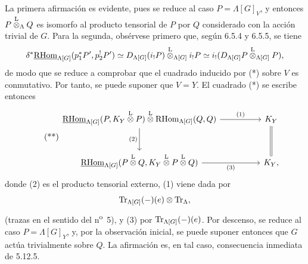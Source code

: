 La primera afirmación es evidente, pues se reduce al caso $P=\Lambda[G]_V$, y entonces $P\overset{\mathrm L}{\otimes}_{\Lambda}Q$ es isomorfo al producto tensorial de $P$ por $Q$ considerado con la acción trivial de $G$. Para la segunda, obsérvese primero que, según 6.5.4 y 6.5.5, se tiene
\[
\delta^*\underline{\mathrm{RHom}}_{\Lambda[G]}(p_1^*P',p_2^!P')
\simeq
D_{\Lambda[G]}(i_!P)\overset{\mathrm L}{\otimes}_{\Lambda[G]} i_!P
\simeq
i_!(D_{\Lambda[G]}P\overset{\mathrm L}{\otimes}_{\Lambda[G]}P),
\]
de modo que se reduce a comprobar que el cuadrado inducido por (*) sobre $V$ es conmutativo. Por tanto, se puede suponer que $V=Y$. El cuadrado (*) se escribe entonces
\begin{equation}
\tag{**}
\begin{tikzcd}[column sep=huge,row sep=large]
\uRHom_{\Lambda[G]}(P,K_Y\lten P)\lten\RHom_{\Lambda[G]}(Q,Q)
  \arrow[r,"(1)"] \arrow[d,"(2)"']
& K_Y \arrow[d,equal]\\
\uRHom_{\Lambda[G]}(P\lten Q,K_Y\lten P\lten Q) \arrow[r,"(3)"']
& K_Y ,
\end{tikzcd}
\end{equation}
donde (2) es el producto tensorial externo, (1) viene dada por
\[
\operatorname{Tr}_{\Lambda[G]}(-)(e)\otimes\operatorname{Tr}_{\Lambda},
\]
(trazas en el sentido del n\textsuperscript{o}~5), y (3) por $\operatorname{Tr}_{\Lambda[G]}(-)(e)$. Por descenso, se reduce al caso $P=\Lambda[G]_Y$, y, por la observación inicial, se puede suponer entonces que $G$ actúa trivialmente sobre $Q$. La afirmación es, en tal caso, consecuencia inmediata de 5.12.5.
